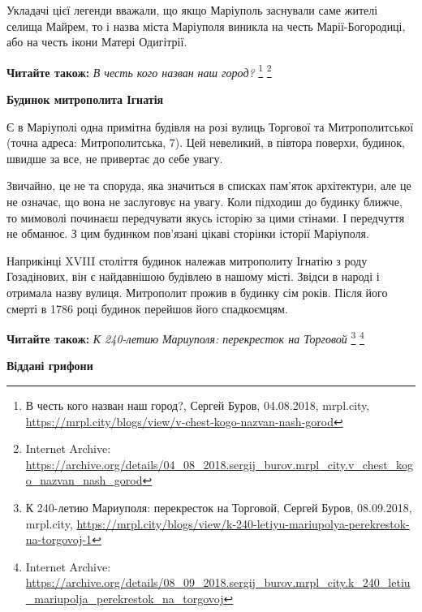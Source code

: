 
Укладачі цієї легенди вважали, що якщо Маріуполь заснували саме жителі селища
Майрем, то і назва міста Маріуполя виникла на честь Марії-Богородиці, або на
честь ікони Матері Одигітрії.

\textbf{Читайте також:} \emph{В честь кого назван наш город?}%
\footnote{В честь кого назван наш город?, Сергей Буров, 04.08.2018, mrpl.city, \url{https://mrpl.city/blogs/view/v-chest-kogo-nazvan-nash-gorod}} %
\footnote{Internet Archive: \url{https://archive.org/details/04_08_2018.sergij_burov.mrpl_city.v_chest_kogo_nazvan_nash_gorod}}

\begin{center}
\bfseries Будинок митрополита Ігнатія	
\end{center}

Є в Маріуполі одна примітна будівля на розі вулиць Торгової та Митрополитської
(точна адреса: Митрополитська, 7). Цей невеликий, в півтора поверхи, будинок,
швидше за все, не привертає до себе увагу.


Звичайно, це не та споруда, яка значиться в списках пам'яток архітектури, але
це не означає, що вона не заслуговує на увагу. Коли підходиш до будинку ближче,
то мимоволі починаєш передчувати якусь історію за цими стінами. І передчуття не
обманює. З цим будинком пов'язані цікаві сторінки історії Маріуполя.

Наприкінці XVIII століття будинок належав митрополиту Ігнатію з роду
Гозадінових, він є найдавнішою будівлею в нашому місті. Звідси в народі і
отримала назву вулиця. Митрополит прожив в будинку сім років. Після його смерті
в 1786 році будинок перейшов його спадкоємцям.

\textbf{Читайте також:} \emph{К 240-летию Мариуполя: перекресток на Торговой}%
\footnote{К 240-летию Мариуполя: перекресток на Торговой, Сергей Буров, 08.09.2018, mrpl.city, \url{https://mrpl.city/blogs/view/k-240-letiyu-mariupolya-perekrestok-na-torgovoj-1}} %
\footnote{Internet Archive: \url{https://archive.org/details/08_09_2018.sergij_burov.mrpl_city.k_240_letiu_mariupolja_perekrestok_na_torgovoj}}

\begin{center}
\bfseries Віддані грифони	
\end{center}


